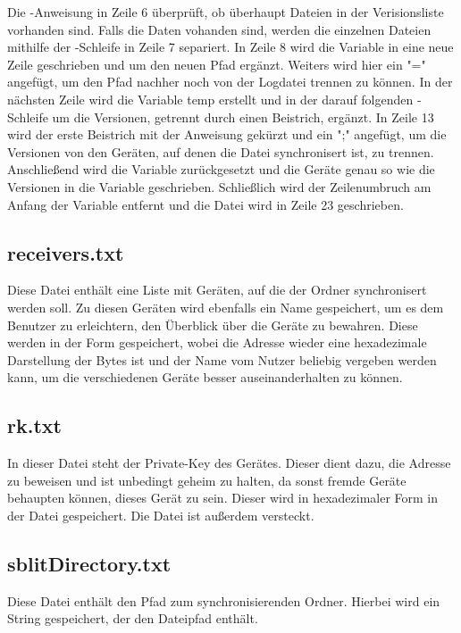 Die -Anweisung in Zeile 6 überprüft, ob überhaupt Dateien in der Verisionsliste vorhanden sind. Falls die Daten vohanden sind, werden die einzelnen Dateien mithilfe der -Schleife in Zeile 7 separiert. In Zeile 8 wird die  Variable in eine neue Zeile geschrieben und um den neuen Pfad ergänzt. Weiters wird hier ein "=" angefügt, um den Pfad nachher noch von der Logdatei trennen zu können. In der nächsten Zeile wird die Variable temp erstellt und in der darauf folgenden -Schleife um die Versionen, getrennt durch einen Beistrich, ergänzt. In Zeile 13 wird der erste Beistrich mit der Anweisung  gekürzt und ein ";" angefügt, um die Versionen von den Geräten, auf denen die Datei synchronisert ist, zu trennen. Anschließend wird die Variable  zurückgesetzt und die Geräte genau so wie die Versionen in die Variable  geschrieben. Schließlich wird der Zeilenumbruch am Anfang der Variable  entfernt und die Datei wird in Zeile 23 geschrieben.

\subsection{receivers.txt} \label{receivers}
Diese Datei enthält eine Liste mit Geräten, auf die der Ordner synchronisert werden soll. Zu diesen Geräten wird ebenfalls ein Name gespeichert, um es dem Benutzer zu erleichtern, den Überblick über die Geräte zu bewahren. Diese werden in der Form  gespeichert, wobei die Adresse wieder eine hexadezimale Darstellung der Bytes ist und der Name vom Nutzer beliebig vergeben werden kann, um die verschiedenen Geräte besser auseinanderhalten zu können.

\subsection{rk.txt}
In dieser Datei steht der Private-Key des Gerätes. Dieser dient dazu, die Adresse zu beweisen und ist unbedingt geheim zu halten, da sonst fremde Geräte behaupten können, dieses Gerät zu sein. Dieser wird in hexadezimaler Form in der Datei gespeichert. Die Datei ist außerdem versteckt.

\subsection{sblitDirectory.txt}
Diese Datei enthält den Pfad zum synchronisierenden Ordner. Hierbei wird ein String gespeichert, der den Dateipfad enthält.

